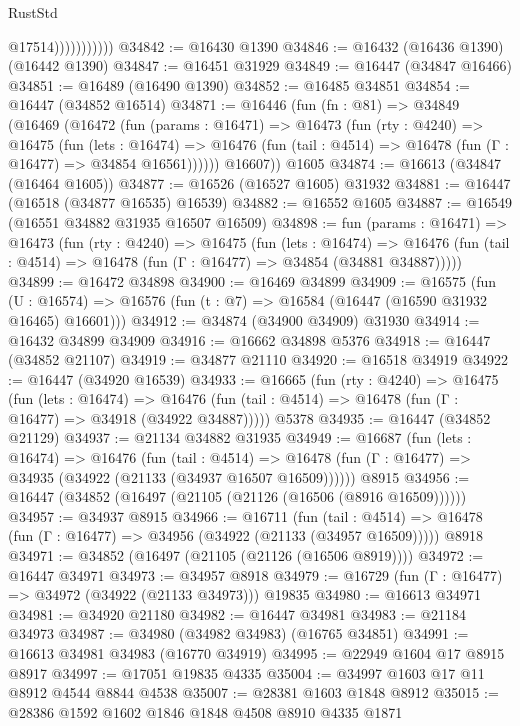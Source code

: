 \begin{lexlean}{RustStd}
\begin{coremodule}
{\begin{coremodule}
{{{{{{{{{{{{{{{{{{{{{{{{{{{{{{{{{{{{{{{{{{{{{{{{{{{{{{{                          @17514)))))))))))
@34842 := @16430 @1390
@34846 := @16432 (@16436 @1390) (@16442 @1390)
@34847 := @16451 @31929
@34849 := @16447 (@34847 @16466)
@34851 := @16489 (@16490 @1390)
@34852 := @16485 @34851
@34854 := @16447 (@34852 @16514)
@34871 := @16446
    (fun (fn : @81) =>
    @34849
      (@16469
        (@16472
          (fun (params : @16471) =>
          @16473
            (fun (rty : @4240) =>
            @16475
              (fun (lets : @16474) =>
              @16476 (fun (tail : @4514) => @16478 (fun (Γ : @16477) => @34854 @16561))))))
        @16607))
    @1605
@34874 := @16613 (@34847 (@16464 @1605))
@34877 := @16526 (@16527 @1605) @31932
@34881 := @16447 (@16518 (@34877 @16535) @16539)
@34882 := @16552 @1605
@34887 := @16549 (@16551 @34882 @31935 @16507 @16509)
@34898 := fun (params : @16471) =>
  @16473
    (fun (rty : @4240) =>
    @16475
      (fun (lets : @16474) =>
      @16476 (fun (tail : @4514) => @16478 (fun (Γ : @16477) => @34854 (@34881 @34887)))))
@34899 := @16472 @34898
@34900 := @16469 @34899
@34909 := @16575
    (fun (U : @16574) => @16576 (fun (t : @7) => @16584 (@16447 (@16590 @31932 @16465) @16601)))
@34912 := @34874 (@34900 @34909) @31930
@34914 := @16432 @34899 @34909
@34916 := @16662 @34898 @5376
@34918 := @16447 (@34852 @21107)
@34919 := @34877 @21110
@34920 := @16518 @34919
@34922 := @16447 (@34920 @16539)
@34933 := @16665
    (fun (rty : @4240) =>
    @16475
      (fun (lets : @16474) =>
      @16476 (fun (tail : @4514) => @16478 (fun (Γ : @16477) => @34918 (@34922 @34887)))))
    @5378
@34935 := @16447 (@34852 @21129)
@34937 := @21134 @34882 @31935
@34949 := @16687
    (fun (lets : @16474) =>
    @16476
      (fun (tail : @4514) =>
      @16478 (fun (Γ : @16477) => @34935 (@34922 (@21133 (@34937 @16507 @16509))))))
    @8915
@34956 := @16447 (@34852 (@16497 (@21105 (@21126 (@16506 (@8916 @16509))))))
@34957 := @34937 @8915
@34966 := @16711
    (fun (tail : @4514) => @16478 (fun (Γ : @16477) => @34956 (@34922 (@21133 (@34957 @16509)))))
    @8918
@34971 := @34852 (@16497 (@21105 (@21126 (@16506 @8919))))
@34972 := @16447 @34971
@34973 := @34957 @8918
@34979 := @16729 (fun (Γ : @16477) => @34972 (@34922 (@21133 @34973))) @19835
@34980 := @16613 @34971
@34981 := @34920 @21180
@34982 := @16447 @34981
@34983 := @21184 @34973
@34987 := @34980 (@34982 @34983) (@16765 @34851)
@34991 := @16613 @34981 @34983 (@16770 @34919)
@34995 := @22949 @1604 @17 @8915 @8917
@34997 := @17051 @19835 @4335
@35004 := @34997 @1603 @17 @11 @8912 @4544 @8844 @4538
@35007 := @28381 @1603 @1848 @8912
@35015 := @28386 @1592 @1602 @1846 @1848 @4508 @8910 @4335 @1871
}}}}}}}}}}}}}}}}}}}}}}}}}}}}}}}}}}}}}}}}}}}}}}}}}}}}}}}
\end{coremodule}}
\end{coremodule}
\end{lexlean}
